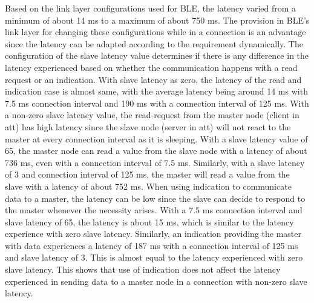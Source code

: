 Based on the link layer configurations used for BLE, the latency varied from a minimum of about 14 ms to a maximum of about 750 ms. The provision in BLE's link layer for changing these configurations while in a connection is an advantage since the latency can be adapted according to the requirement dynamically. The configuration of the slave latency value determines if there is any difference in the latency experienced based on whether the communication happens with a read request or an indication. With slave latency as zero, the latency of the read and indication case is almost same, with the average latency being around 14 ms with 7.5 ms connection interval and 190 ms with a connection interval of 125 ms. With a non-zero slave latency value, the read-request from the master node (client in \gls{att}) has high latency since the slave node (server in \gls{att}) will not react to the master at every connection interval as it is sleeping. With a slave latency value of 65, the master node can read a value from the slave node with a latency of about 736 ms, even with a connection interval of 7.5 ms. Similarly, with a slave latency of 3 and connection interval of 125 ms, the master will read a value from the slave with a latency of about 752 ms. When using indication to communicate data to a master, the latency can be low since the slave can decide to respond to the master whenever the necessity arises. With a 7.5 ms connection interval and slave latency of 65, the latency is about 15 ms, which is similar to the latency experience with zero slave latency. Similarly, an indication providing the master with data experiences a latency of 187 ms with a connection interval of 125 ms and slave latency of 3. This is almost equal to the latency experienced with zero slave latency. This shows that use of indication does not affect the latency experienced in sending data to a master node in a connection with non-zero slave latency.


